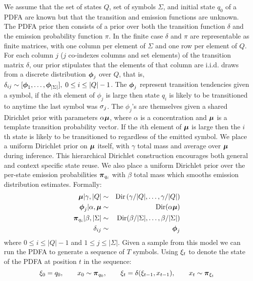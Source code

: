 We assume that the set of states $Q$, set of symbols $\Sigma$, and initial state $q_0$ of a PDFA are known but that the transition and emission functions are unknown.  The PDFA prior then consists of a prior over both the transition function $\delta$ and the emission probability function $\pi$.  In the finite case $\delta$ and $\pi$ are representable as finite matrices, with one column per element of $\Sigma$ and one row per element of $Q$.  For each column $j$ ($j$ co-indexes columns and set elements) of the transition matrix $\delta$, our prior stipulates that the elements of that column are  i.i.d. draws from a discrete distribution $\bphi_j$ over $Q$, that is, $\delta_{ij} \sim [\bphi_1,\ldots,\bphi_{|\Sigma|}], \; 0 \leq i\leq|Q|-1$.  The $\bphi_j$ represent transition tendencies given a symbol, if the $i$th element of $\phi_{j}$ is large then state $q_i$ is likely to be transitioned to anytime the last symbol was $\symb_j$.   The $\phi_{j}$'s are   themselves given a shared Dirichlet prior with parameters $\alpha\bmu$, where $\alpha$ is a concentration and $\bmu$ is a template transition probability vector.   If the $i$th element of $\bmu$ is large then the $i$th state is likely to be transitioned to regardless of the emitted symbol.  We place a uniform Dirichlet prior on $\bmu$ itself, with $\gamma$ total mass and average over $\bmu$ during inference.  This hierarchical Dirichlet construction encourages both general and context specific state reuse.
 We also place a uniform Dirichlet prior over the per-state emission probabilities $\bpi_{q_i}$ with $\beta$ total mass which smooths emission distribution estimates.  Formally:
%
\begin{eqnarray}
\bmu|\gamma,|Q| & \sim & \mathrm{Dir}\left(\gamma/|Q|,\ldots,\gamma/|Q|\right) \label{gen:mu}  \\
\bphi_{j}|\alpha,\bmu  & \sim & \mathrm{Dir}(\alpha\bmu) \label{gen:phi} \\
\bpi_{q_i}|\beta,|\Sigma| & \sim & \mathrm{Dir}(\beta/|\Sigma|,\ldots,\beta/|\Sigma|) \label{gen:pi} \nonumber \\
\delta_{ij} & \sim & \bphi_{j} \label{gen:delta} \nonumber
\end{eqnarray}
%
where $0 \leq i \leq |Q|-1$ and $1 \leq j \leq |\Sigma|$.  Given a sample from this model we can run the PDFA to generate a sequence of $T$ symbols.  Using $\q_t$ to denote the state of the PDFA at position $t$ in the sequence:
%
\begin{equation}
\q_0 = \state_0, \qquad
x_0 \sim \bpi_{q_0}, \qquad
\q_t = \delta(\q_{t-1},x_{t-1}), \qquad
x_t \sim \bpi_{\q_t} \label{gen} \nonumber
\end{equation}
